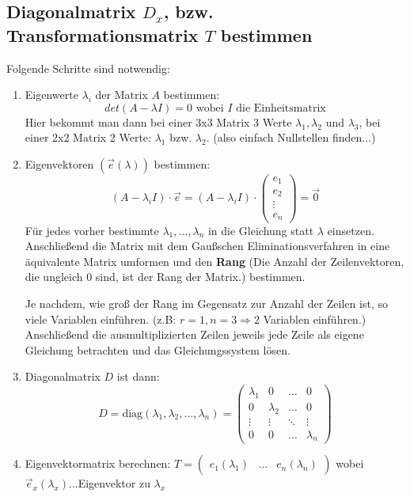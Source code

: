\subsection{Diagonalmatrix $D_x$, bzw. Transformationsmatrix $T$ bestimmen}
Folgende Schritte sind notwendig:
\begin{enumerate}[1)]
    \item Eigenwerte $\lambda_i$ der Matrix $A$ bestimmen:\\
        \[det(A-\lambda I)=0\text{ wobei $I$ die Einheitsmatrix}\] 
        Hier bekommt man dann bei einer 3x3 Matrix 3 Werte $\lambda_1, \lambda_2$ und $\lambda_3$, bei einer 2x2 Matrix 2 Werte: $\lambda_1$ bzw. $\lambda_2$. (also einfach Nullstellen finden...)
    \item Eigenvektoren $(\vec e(\lambda))$ bestimmen:\\
        \[(A-\lambda_i I)\cdot \vec e=(A-\lambda_iI)\cdot\left(\begin{array}{c}e_1\\e_2\\\vdots\\e_n\end{array}\right)=\vec 0\]
        Für jedes vorher bestimmte $\lambda_1,...,\lambda_n$ in die Gleichung statt $\lambda$ einsetzen.
        Anschließend die Matrix mit dem Gaußschen Eliminationsverfahren in eine äquivalente Matrix umformen und den \textbf{Rang} (Die Anzahl der Zeilenvektoren, die ungleich 0 sind, ist der Rang der Matrix.) bestimmen.
        
        Je nachdem, wie groß der Rang im Gegensatz zur Anzahl der Zeilen ist, so viele Variablen einführen. (z.B: $r=1, n=3\Rightarrow 2$ Variablen einführen.)
        Anschließend die ausmultiplizierten Zeilen jeweils jede Zeile als eigene Gleichung betrachten und das Gleichungssystem lösen.
    \item Diagonalmatrix $D$ ist dann: \\
        \[D=\text{diag}(\lambda_1,\lambda_2,...,\lambda_n)=\left(
        \begin{array}{cccc}
        \lambda_1 & 0 & \dots & 0\\
        0 & \lambda_2 & \dots & 0\\
        \vdots & \vdots & \ddots & \vdots\\
        0 & 0 & \dots & \lambda_n
        \end{array}\right)\]
    \item Eigenvektormatrix berechnen: $T=\left(\begin{array}{ccc}e_1(\lambda_1) & \dots & e_n(\lambda_n)\end{array}\right)$ wobei $\vec e_x(\lambda_x)$...Eigenvektor zu $\lambda_x$
\end{enumerate}

